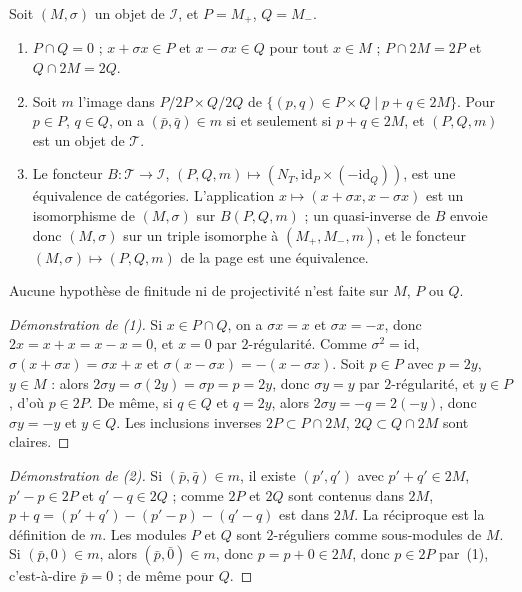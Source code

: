 \begin{encadre}
\begin{theoreme}
Soit $(M, \sigma)$ un objet de $\mathcal I$, et $P = M_+$, $Q = M_-$.
\begin{enumerate}
\item $P \cap Q = 0$ ; $x + \sigma x \in P$ et $x - \sigma x \in Q$ pour tout $x \in M$ ; $P \cap 2M = 2P$ et $Q \cap 2M = 2Q$.
\item Soit $m$ l'image dans $P/2P \times Q/2Q$ de $\{(p, q) \in P \times Q \mid p + q \in 2M\}$. Pour $p \in P$, $q \in Q$, on a $(\bar p, \bar q) \in m$ si et seulement si $p + q \in 2M$, et $(P, Q, m)$ est un objet de $\mathcal T$.
\item Le foncteur $B : \mathcal T \to \mathcal I$, $(P, Q, m) \mapsto (N_T, \mathrm{id}_P \times (-\mathrm{id}_Q))$, est une équivalence de catégories. L'application $x \mapsto (x + \sigma x, x - \sigma x)$ est un isomorphisme de $(M, \sigma)$ sur $B(P, Q, m)$ ; un quasi-inverse de $B$ envoie donc $(M, \sigma)$ sur un triple isomorphe à $(M_+, M_-, m)$, et le foncteur $(M, \sigma) \mapsto (P, Q, m)$ de la page est une équivalence.
\end{enumerate}
Aucune hypothèse de finitude ni de projectivité n'est faite sur $M$, $P$ ou $Q$.
\end{theoreme}
\end{encadre}

\begin{proof}[Démonstration de (1)]
Si $x \in P \cap Q$, on a $\sigma x = x$ et $\sigma x = -x$, donc $2x = x + x = x - x = 0$, et $x = 0$ par $2$-régularité. Comme $\sigma^2 = \mathrm{id}$, $\sigma(x + \sigma x) = \sigma x + x$ et $\sigma(x - \sigma x) = -(x - \sigma x)$. Soit $p \in P$ avec $p = 2y$, $y \in M$ : alors $2\sigma y = \sigma(2y) = \sigma p = p = 2y$, donc $\sigma y = y$ par $2$-régularité, et $y \in P$, d'où $p \in 2P$. De même, si $q \in Q$ et $q = 2y$, alors $2\sigma y = -q = 2(-y)$, donc $\sigma y = -y$ et $y \in Q$. Les inclusions inverses $2P \subset P \cap 2M$, $2Q \subset Q \cap 2M$ sont claires.
\end{proof}

\begin{proof}[Démonstration de (2)]
Si $(\bar p, \bar q) \in m$, il existe $(p', q')$ avec $p' + q' \in 2M$, $p' - p \in 2P$ et $q' - q \in 2Q$ ; comme $2P$ et $2Q$ sont contenus dans $2M$, $p + q = (p' + q') - (p' - p) - (q' - q)$ est dans $2M$. La réciproque est la définition de $m$. Les modules $P$ et $Q$ sont $2$-réguliers comme sous-modules de $M$. Si $(\bar p, 0) \in m$, alors $(\bar p, \bar 0) \in m$, donc $p = p + 0 \in 2M$, donc $p \in 2P$ par~(1), c'est-à-dire $\bar p = 0$ ; de même pour $Q$.
\end{proof}

